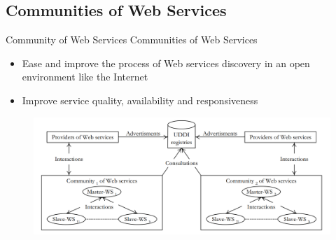 \documentclass{beamer}
\begin{document}
\subsection{Communities of Web Services}
    \begin{frame}{Community of Web Services}
        Communities of Web Services
        \begin{itemize}
            \item Ease and improve the process of Web services discovery in an open environment like the Internet
        	\item Improve service quality, availability and responsiveness
        \end{itemize}

        \begin{figure}[htbp]
            \centering
            \includegraphics[width=1.0 \columnwidth]{figures/wscommunity2.png}
        \end{figure}

    \end{frame}
\end{document}
